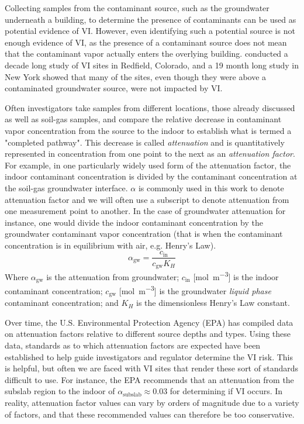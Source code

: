 Collecting samples from the contaminant source, such as the groundwater underneath a building, to determine the presence of contaminants can be used as potential evidence of VI.
However, even identifying such a potential source is not enough evidence of VI, as the presence of a contaminant source does not mean that the contaminant vapor actually enters the overlying building.
\citeauthor{folkes_observed_2009}\cite{folkes_observed_2009} conducted a decade long study of VI sites in Redfield, Colorado, and a 19 month long study in New York showed that many of the sites, even though they were above a contaminated groundwater source, were not impacted by VI.\par

Often investigators take samples from different locations, those already discussed as well as soil-gas samples, and compare the relative decrease in contaminant vapor concentration from the source to the indoor to establish what is termed a "completed pathway".
This decrease is called \textit{attenuation} and is quantitatively represented in concentration from one point to the next as an \textit{attenuation factor}.
For example, in one particularly widely used form of the attenuation factor, the indoor contaminant concentration is divided by the contaminant concentration at the soil-gas groundwater interface.
$\alpha$ is commonly used in this work to denote attenuation factor and we will often use a subscript to denote attenuation from one measurement point to another.
In the case of groundwater attenuation for instance, one would divide the indoor contaminant concentration by the groundwater contaminant vapor concentration (that is when the contaminant concentration is in equilibrium with air, e.g. Henry's Law).
\begin{equation}
  \alpha_\mathrm{gw} = \frac{c_\mathrm{in}}{c_\mathrm{gw} K_H}
\end{equation}
Where $\alpha_\mathrm{gw}$  is the attenuation from groundwater;
$c_\mathrm{in}$ [\si{\mol\per\metre\cubed}] is the indoor contaminant concentration;
$c_\mathrm{gw}$ [\si{\mol\per\metre\cubed}] is the groundwater \textit{liquid phase} contaminant concentration;
and $K_H$ is the dimensionless Henry's Law constant.\par

Over time, the U.S. Environmental Protection Agency (EPA) has compiled data on attenuation factors relative to different source depths and types.
Using these data, standards as to which attenuation factors are expected have been established to help guide investigators and regulator determine the VI risk.
This is helpful, but often we are faced with VI sites that render these sort of standards difficult to use.
For instance, the EPA recommends that an attenuation from the subslab region to the indoor of $\alpha_\mathrm{subslab} \approx 0.03$ for determining if VI occurs.
In reality, attenuation factor values can vary by orders of magnitude due to a variety of factors, and that these recommended values can therefore be too conservative\cite{yao_examination_2013}.\par

